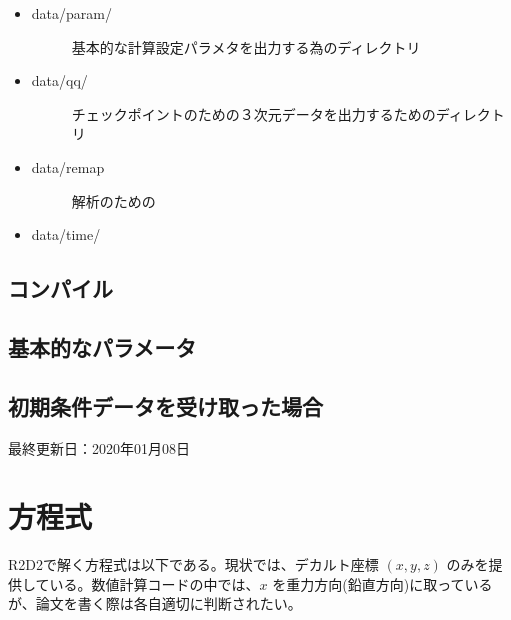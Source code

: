 \documentclass[letterpaper,10pt,dvipdfmx,report]{sphinxmanual}
\begin{document}
\begin{itemize}
\begin{description}
\begin{itemize}
\begin{description}
\end{description}

\item {} \begin{description}
\item[{data/param/}] \leavevmode
基本的な計算設定パラメタを出力する為のディレクトリ

\end{description}

\item {} \begin{description}
\item[{data/qq/}] \leavevmode
チェックポイントのための３次元データを出力するためのディレクトリ

\end{description}

\item {} \begin{description}
\item[{data/remap}] \leavevmode
解析のための

\end{description}

\item {} 
data/time/

\end{itemize}

\end{description}

\end{itemize}


\section{コンパイル}
\label{\detokenize{start:id2}}

\section{基本的なパラメータ}
\label{\detokenize{start:id3}}

\section{初期条件データを受け取った場合}
\label{\detokenize{start:id4}}
最終更新日：2020年01月08日


\chapter{方程式}
\label{\detokenize{equation:id1}}\label{\detokenize{equation::doc}}
R2D2で解く方程式は以下である。現状では、デカルト座標 \((x,y,z)\)  のみを提供している。数値計算コードの中では、\(x\) を重力方向(鉛直方向)に取っているが、論文を書く際は各自適切に判断されたい。
\end{document}

